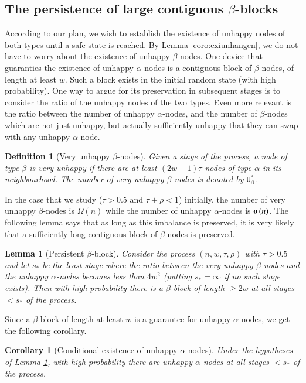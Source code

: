 \documentclass[11pt]{article}
\theoremstyle{plain}
\newtheorem{lem}[thm]{Lemma}
\newtheorem{coro}[thm]{Corollary}
\newtheorem{defi}[thm]{Definition}
\numberwithin{equation}{subsection}
\newcommand{\smo}[1]{\mathop{\bf o}\/\left({#1}\right)}
\newcommand{\unhap}{\mathtt{U}}
\begin{document}
\subsection{The persistence of large contiguous \texorpdfstring{$\beta$}{beta}-blocks}\label{se:persist}
According to our plan, we wish to establish the existence of unhappy nodes of both types until a safe state is reached.
By Lemma \ref{coro:exiunhangen}, we do not have to worry about the existence of unhappy $\beta$-nodes. One device that guaranties the  existence of
unhappy $\alpha$-nodes is a contiguous block of $\beta$-nodes, of length at least $w$. 
Such a block exists in the initial random state (with high probability). One way to argue for its preservation in subsequent stages is to consider the 
ratio of the unhappy nodes of the two types. 
Even more relevant is the ratio between the number of unhappy $\alpha$-nodes, 
and the number of $\beta$-nodes which are not just unhappy, but actually sufficiently unhappy that they can swap with any unhappy $\alpha$-node.

\begin{defi}[Very unhappy $\beta$-nodes]\label{de:veryunhapy}
Given a stage of the process, a node of type $\beta$ is very unhappy if
there are at least $(2w+1)\tau$ nodes of type $\alpha$ in its neighbourhood.
The number of very unhappy $\beta$-nodes is denoted by $\unhap_{\beta}^{\ast}$.
\end{defi}

In the case that we study ($\tau>0.5$ and  $\tau+\rho<1$) 
initially, the number of very unhappy $\beta$-nodes is $\Omega(n)$ while the
number of unhappy $\alpha$-nodes is $\smo{n}$.
The following lemma says that as long as this imbalance is preserved, it is very likely that a
sufficiently long contiguous block of $\beta$-nodes is preserved.
\begin{lem}[Persistent \texorpdfstring{$\beta$}{beta}-block]
\label{le:persistb}
Consider the process
$(n,w,\tau,\rho)$ with $\tau>0.5$  
and let $s_{\ast}$ be the least stage where
the ratio between the very unhappy $\beta$-nodes and the unhappy $\alpha$-nodes
becomes less than $4w^2$ (putting $s_{\ast}=\infty$ if no such stage exists). Then with 
high probability there is a $\beta$-block of length $\geq 2w$ at all
stages $<s_{\ast}$ of the process. 
\end{lem}

Since a $\beta$-block of length at least $w$ is a
guarantee for unhappy $\alpha$-nodes, we get the following corollary.

\begin{coro}[Conditional existence of unhappy $\alpha$-nodes]\label{le:percosistb}
Under the hypotheses of Lemma \ref{le:persistb}, 
with high probability 
there are unhappy $\alpha$-nodes at 
all stages $<s_{\ast}$ of the process.
\end{coro}
\end{document}
